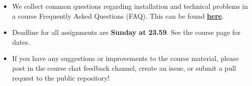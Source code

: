 \begin{itemize}

\item We collect common questions regarding installation and technical problems in a course Frequently Asked Questions (FAQ). This can be found \href{https://github.com/MansMeg/IntroML/blob/master/FAQ.md}{\textbf{here}}.

\item Deadline for all assignments are \textbf{Sunday at 23.59}. See the course page for dates.

\item If you have any suggestions or improvements to the course material, please post in the course chat feedback channel, create an issue, or submit a pull request to the public repository!

\end{itemize}

